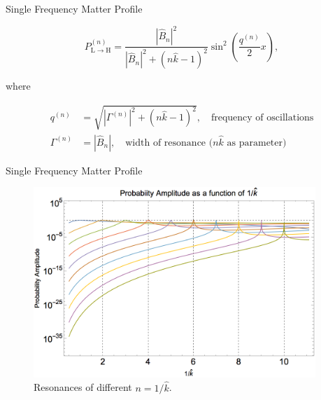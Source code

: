\documentclass[9pt]{beamer}
\begin{document}
\begin{darkframes}
\begin{frame}{Single Frequency Matter Profile}


\begin{tcolorbox}[title=Transition Probability]

\begin{equation*}
    P_{\mathrm{L\to H}}^{(n)} = \frac{  \left\lvert \hat B_{n}  \right\rvert^2 }{ \left\lvert  \hat B_{n}  \right\rvert^2 + ( n \hat k - 1 )^2  } \sin^2 \left( \frac{ q^{(n)} }{2} x \right)  ,
\end{equation*}

where

\begin{align*}
    q^{(n)} &= \sqrt{\left\lvert  \Gamma^{(n)} \right\rvert^2 + ( n \hat k - 1 )^2},\quad \text{frequency of oscillations} \\
    \Gamma^{(n)} &= \left\lvert \hat B_{n} \right\rvert, \quad \text{width of resonance ($n\hat k$ as parameter)}
\end{align*}


\end{tcolorbox}


\end{frame}


\begin{frame}{Single Frequency Matter Profile}





\begin{figure}
\centering
\includegraphics[width=0.95\textwidth]{assets/stimulated-single-frequency-resonances-k-orders.png}
\caption*{Resonances of different $n = 1/\hat k$.}
\end{figure}





\end{frame}
\end{darkframes}
\end{document}
